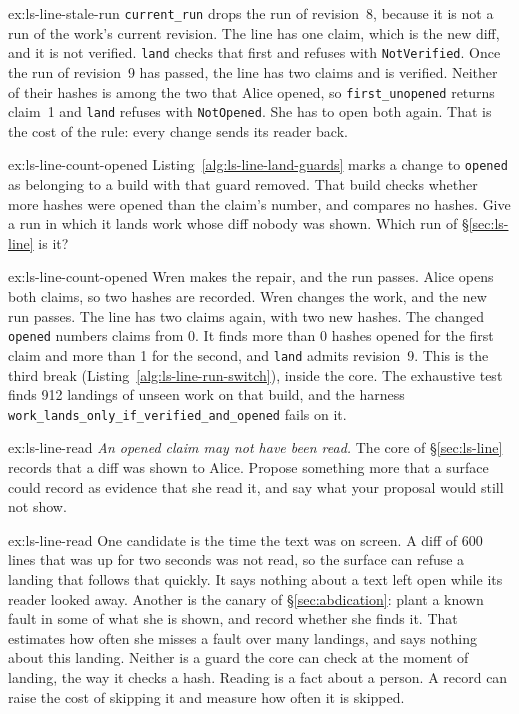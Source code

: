 \documentclass[11pt,a4paper]{article}
\theoremstyle{definition}
\theoremstyle{plain}
\begin{document}
\begin{pdsolution}{ex:ls-line-stale-run}
\texttt{current\_run} drops the run of revision~8, because it is not a run
of the work's current revision. The line has one claim, which is the new
diff, and it is not verified. \texttt{land} checks that first and refuses with
\texttt{NotVerified}. Once the run of revision~9 has passed, the line has
two claims and is verified. Neither of their hashes is among the two that
Alice opened, so \texttt{first\_unopened} returns claim~1 and \texttt{land}
refuses with \texttt{NotOpened}. She has to open both again. That is the
cost of the rule: every change sends its reader back.
\end{pdsolution}
\begin{pdexercise}[kind=Trace,rating=2]{ex:ls-line-count-opened}
Listing~\ref{alg:ls-line-land-guards} marks a change to \texttt{opened} as
belonging to a build with that guard removed. That build checks whether
more hashes were opened than the claim's number, and compares no hashes.
Give a run in which it lands work whose diff nobody was shown. Which run
of \S\ref{sec:ls-line} is it?
\end{pdexercise}
\begin{pdsolution}{ex:ls-line-count-opened}
Wren makes the repair, and the run passes. Alice opens both claims, so two
hashes are recorded. Wren changes the work, and the new run passes. The
line has two claims again, with two new hashes. The changed \texttt{opened}
numbers claims from 0. It finds more than 0 hashes opened for the first
claim and more than 1 for the second, and \texttt{land} admits revision~9.
This is the third break (Listing~\ref{alg:ls-line-run-switch}), inside the
core. The exhaustive test finds 912 landings of unseen work on that build,
and the harness \texttt{work\_lands\_only\_if\_verified\_and\_opened} fails
on it.
\end{pdsolution}
\begin{pdexercise}[kind=Open,rating=3]{ex:ls-line-read}
\emph{An opened claim may not have been read.} The core of
\S\ref{sec:ls-line} records that a diff was shown to Alice. Propose
something more that a surface could record as evidence that she read it,
and say what your proposal would still not show.
\end{pdexercise}
\begin{pdsolution}{ex:ls-line-read}
One candidate is the time the text was on screen. A diff of 600 lines that
was up for two seconds was not read, so the surface can refuse a landing
that follows that quickly. It says nothing about a text left open while
its reader looked away. Another is the canary of \S\ref{sec:abdication}:
plant a known fault in some of what she is shown, and record whether she
finds it. That estimates how often she misses a fault over many landings,
and says nothing about this landing. Neither is a guard the core can check
at the moment of landing, the way it checks a hash. Reading is a fact
about a person. A record can raise the cost of skipping it and measure how
often it is skipped.
\end{pdsolution}
\end{document}
